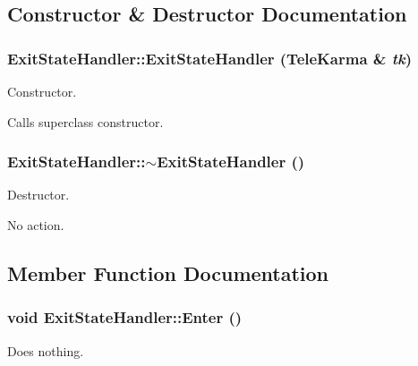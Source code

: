 \subsection{Constructor \& Destructor Documentation}
\hypertarget{classExitStateHandler_8504cb5ec7dfbd0f66351e0335f4ff38}{
\subsubsection[{ExitStateHandler}]{\setlength{\rightskip}{0pt plus 5cm}ExitStateHandler::ExitStateHandler ({\bf TeleKarma} \& {\em tk})}}
\label{classExitStateHandler_8504cb5ec7dfbd0f66351e0335f4ff38}


Constructor. 

Calls superclass constructor. \hypertarget{classExitStateHandler_c793d8775665eb50fd36d88e8416ad9b}{
\subsubsection[{$\sim$ExitStateHandler}]{\setlength{\rightskip}{0pt plus 5cm}ExitStateHandler::$\sim$ExitStateHandler ()}}
\label{classExitStateHandler_c793d8775665eb50fd36d88e8416ad9b}


Destructor. 

No action. 

\subsection{Member Function Documentation}
\hypertarget{classExitStateHandler_a17a1677784b257819f1ec731d1e9bdb}{
\subsubsection[{Enter}]{\setlength{\rightskip}{0pt plus 5cm}void ExitStateHandler::Enter ()}}
\label{classExitStateHandler_a17a1677784b257819f1ec731d1e9bdb}


Does nothing. 



